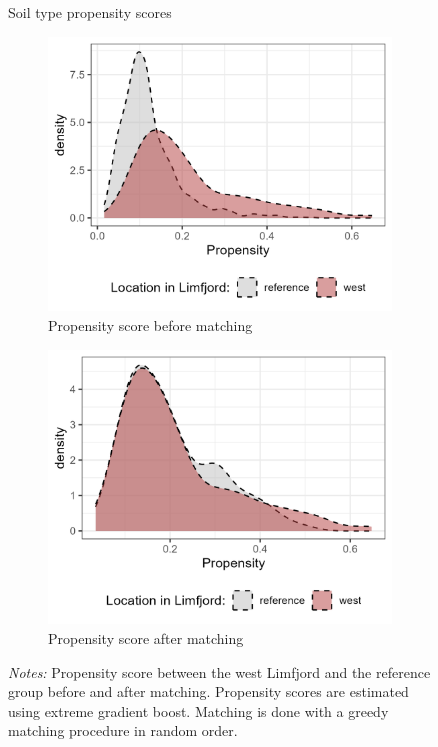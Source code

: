 \documentclass[11pt]{article}
\begin{document}
\begin{figure}
    \centering
    \caption{Soil type propensity scores}
    \begin{subfigure}[b]{0.45\textwidth}
        \centering
        \caption{Propensity score before matching} \label{fig:prop1}
        \includegraphics[width=\textwidth]{Plots/Propensity_before.png}
    \end{subfigure}
    \hfill
    \begin{subfigure}[b]{0.45\textwidth}
        \centering
        \caption{Propensity score after matching} \label{fig:prop2}
        \includegraphics[width=\textwidth]{Plots/Propensity_after.png}
    \end{subfigure}
    \parbox{0.9\textwidth}{
    \caption*{\footnotesize \textit{Notes:} Propensity score between the west Limfjord and the reference group before and after matching. Propensity scores are estimated using extreme gradient boost. Matching is done with a greedy matching procedure in random order.}
}
    \label{fig:prop_score}
\end{figure}
\end{document}
